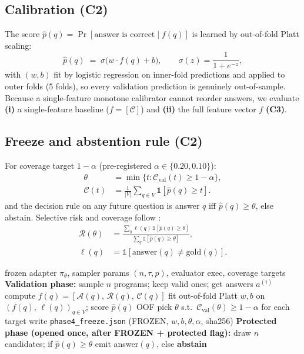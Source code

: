 \documentclass[conference]{IEEEtran}
\newcommand{\ourmethod}{EVG-CAS}
\newcommand{\RR}{\mathcal{R}}
\newcommand{\CC}{\mathcal{C}}
\newcommand{\p}{\hat p}
\begin{document}
\subsection{Calibration (C2)}
The score $\p(q) = \Pr[\text{answer is correct} \mid f(q)]$ is learned by out-of-fold
Platt scaling:
\begin{equation}
  \p(q) \;=\; \sigma\!\big(w\cdot f(q) + b\big), \qquad
  \sigma(z) = \frac{1}{1+e^{-z}} ,
\end{equation}
with $(w,b)$ fit by logistic regression on inner-fold predictions and applied to outer folds
(5 folds), so every validation prediction is genuinely out-of-sample. Because a single-feature
monotone calibrator cannot reorder answers, we evaluate \textbf{(i)} a single-feature baseline
($f=[\mathcal{C}]$) and \textbf{(ii)} the full feature vector $f$ \textbf{(C3)}.

\subsection{Freeze and abstention rule (C2)}
For coverage target $1-\alpha$ (pre-registered $\alpha \in \{0.20, 0.10\}$):
\begin{equation}
\begin{aligned}
  \theta &= \min\{t : \CC_{\text{val}}(t) \ge 1-\alpha\},\\
  \CC(t) &= \frac{1}{|V|}\sum_{q\in V}\mathbb{1}[\p(q)\ge t].
\end{aligned}
\end{equation}
and the decision rule on any future question is answer $q$ iff $\p(q) \ge \theta$, else abstain.
Selective risk and coverage follow \citep{eliyaniv2010selective}:
\begin{equation}
\begin{aligned}
  \RR(\theta)&=\frac{\sum_q \ell(q)\,\mathbb{1}[\p(q)\ge\theta]}
                    {\sum_q\mathbb{1}[\p(q)\ge\theta]},\\
  \ell(q)&=\mathbb{1}[\text{answer}(q)\neq \text{gold}(q)].
\end{aligned}
\end{equation}

\begin{algorithm}[t]
\caption{\ourmethod{} decision pipeline (fit once on validation; frozen thereafter)}
\begin{algorithmic}[1]
\Require frozen adapter $\pi_\theta$, sampler params $(n,\tau,p)$, evaluator $\text{exec}$, coverage targets
\State \textbf{Validation phase:}
  \State sample $n$ programs; keep valid ones; get answers $a^{(i)}$
  \State compute $f(q)=[\mathcal{A}(q),\,\mathcal{R}(q),\,\mathcal{C}(q)]$
\EndFor
\State fit out-of-fold Platt $w,b$ on $(f(q),\,\ell(q))_{q\in V}$; score $\p(q)$ OOF
\State pick $\theta$ s.t.\ $\CC_{\text{val}}(\theta) \ge 1-\alpha$ for each target
\State write \texttt{phase4\_freeze.json} (FROZEN, $w,b,\theta,\alpha$, sha256)
\State \textbf{Protected phase (opened once, after FROZEN + protected flag):}
  \State draw $n$ candidates; if $\p(q) \ge \theta$ emit answer$(q)$, else \textbf{abstain}
\EndFor
\end{algorithmic}
\end{algorithm}
\end{document}
